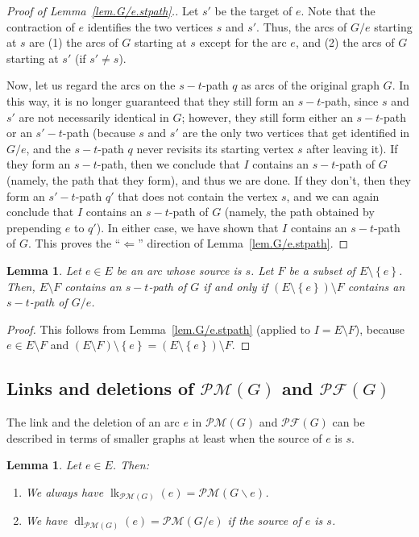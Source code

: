 \documentclass[12pt]{amsart}
\newtheorem{lemma}[theorem]{Lemma}
\theoremstyle{definition}
\DeclareMathOperator{\lk}{lk}
\DeclareMathOperator{\dl}{dl}
\newcommand{\set}[1]{\left\{ #1 \right\}}
\newcommand{\tup}[1]{\left( #1 \right)}
\newcommand{\Pm}[1]{\mathcal{PM}\left(#1\right)}
\newcommand{\Pf}[1]{\mathcal{PF}\left(#1\right)}
\begin{document}
\begin{proof}[Proof of Lemma~\ref{lem.G/e.stpath}.]
Let $s'$ be the target of $e$. Note that the contraction of $e$ identifies the two vertices $s$ and $s'$.
Thus, the arcs of $G / e$ starting at $s$ are (1) the arcs of $G$ starting at $s$ except for the arc $e$, and (2) the arcs of $G$ starting at $s'$ (if $s' \neq s$).

Now, let us regard the arcs on the $s-t$-path $q$ as arcs of the original graph $G$.
In this way, it is no longer guaranteed that they still form an $s-t$-path,
since $s$ and $s'$ are not necessarily identical in $G$;
however, they still form either an $s-t$-path or an $s'-t$-path (because $s$ and $s'$ are the only two vertices that get identified in $G / e$, and the $s-t$-path $q$ never revisits its starting vertex $s$ after leaving it).
If they form an $s-t$-path, then we conclude that $I$ contains an $s-t$-path of $G$ (namely, the path that they form), and thus we are done.
If they don't, then they form an $s'-t$-path $q'$ that does not contain the vertex $s$, and we can again conclude that $I$ contains an $s-t$-path of $G$ (namely, the path obtained by prepending $e$ to $q'$).
In either case, we have shown that $I$ contains an $s-t$-path of $G$.
This proves the ``$\Longleftarrow$'' direction of Lemma~\ref{lem.G/e.stpath}.
\end{proof}

\begin{lemma} \label{lem.G/e.stpath-comp}
    Let $e \in E$ be an arc whose source is $s$.
    Let $F$ be a subset of $E \setminus \set{e}$.
    Then, $E \setminus F$ contains an $s-t$-path of $G$ if and only if $\tup{E \setminus \set{e}} \setminus F$ contains an $s-t$-path of $G / e$.
\end{lemma}

\begin{proof}
This follows from Lemma~\ref{lem.G/e.stpath} (applied to $I = E \setminus F$), because $e \in E \setminus F$ and $\tup{E \setminus F} \setminus \set{e} = \tup{E \setminus \set{e}} \setminus F$.
\end{proof}

\subsection{\label{subsect.delcont.PF-PM-lk-dl}Links and deletions of $\Pm{G}$ and $\Pf{G}$}

The link and the deletion of an arc $e$ in $\Pm{G}$ and $\Pf{G}$ can be described in terms of smaller graphs at least when the source of $e$ is $s$.

\begin{lemma}\label{lem:delcon}
    Let $e \in E$. Then:
    \begin{enumerate}
        \item[(a)] We always have $\lk_{\Pm{G}}(e) = \Pm{G \backslash e}$.
        \item[(b)] We have $\dl_{\Pm{G}}(e) = \Pm{G / e}$ if the source of $e$ is $s$.
    \end{enumerate}
\end{lemma}
\end{document}
